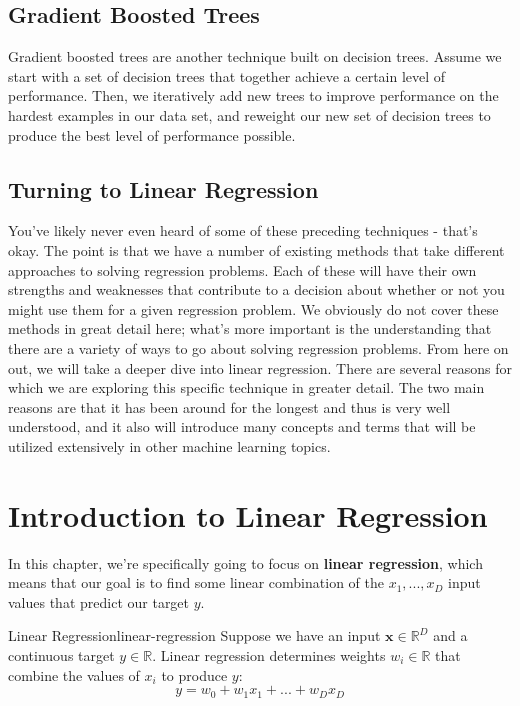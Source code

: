 \subsection{Gradient Boosted Trees}
Gradient boosted trees are another technique built on decision trees. Assume we start with a set of decision trees that together achieve a certain level of performance. Then, we iteratively add new trees to improve performance on the hardest examples in our data set, and reweight our new set of decision trees to produce the best level of performance possible.

\subsection{Turning to Linear Regression}
You've likely never even heard of some of these preceding techniques - that's okay. The point is that we have a number of existing methods that take different approaches to solving regression problems. Each of these will have their own strengths and weaknesses that contribute to a decision about whether or not you might use them for a given regression problem. We obviously do not cover these methods in great detail here; what's more important is the understanding that there are a variety of ways to go about solving regression problems. From here on out, we will take a deeper dive into linear regression. There are several reasons for which we are exploring this specific technique in greater detail. The two main reasons are that it has been around for the longest and thus is very well understood, and it also will introduce many concepts and terms that will be utilized extensively in other machine learning topics.

\section{Introduction to Linear Regression}
In this chapter, we're specifically going to focus on \textbf{linear regression}, which means that our goal is to find some linear combination of the $x_{1}, ..., x_{D}$ input values that predict our target $y$.

\begin{definition}{Linear Regression}{linear-regression}
Suppose we have an input $\textbf{x}\in\mathbb{R}^D$ and a continuous target $y\in\mathbb{R}$.
Linear regression determines weights $w_{i}\in\mathbb{R}$ that combine the values of $x_{i}$ to produce $y$:
\begin{equation}
    y = w_{0} + w_{1}x_{1} + ... + w_{D}x_{D}
\end{equation}

\end{definition}

